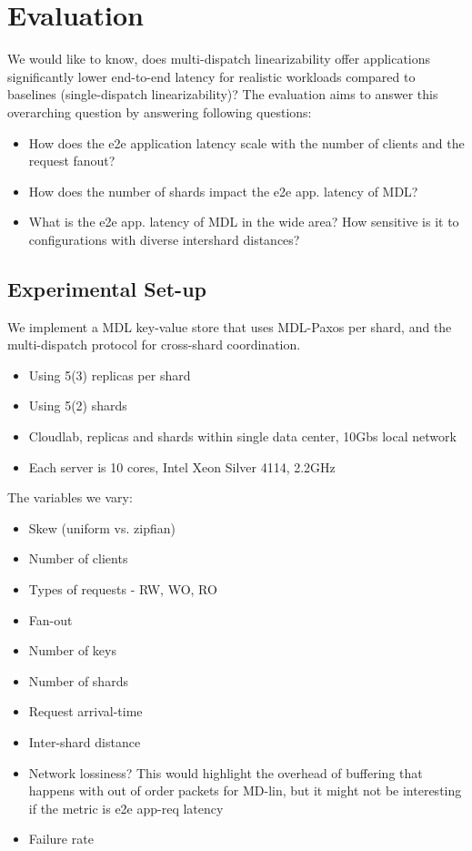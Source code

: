 \section{Evaluation}
\label{sec:eval}

We would like to know, does multi-dispatch linearizability offer applications significantly lower end-to-end latency for realistic workloads compared to baselines (single-dispatch linearizability)?
The evaluation aims to answer this overarching question by answering following questions:

\begin{itemize}
\item How does the e2e application latency scale with the number of clients and the request fanout?

\item How does the number of shards impact the e2e app. latency of MDL?

\item What is the e2e app. latency of MDL in the wide area? How sensitive is it to configurations with diverse intershard distances?
\end{itemize}

\subsection{Experimental Set-up}
We implement a MDL key-value store that uses MDL-Paxos per shard, and the multi-dispatch protocol for cross-shard coordination.
\begin{itemize}
    \item Using 5(3) replicas per shard
    \item Using 5(2) shards
    \item Cloudlab, replicas and shards within single data center, 10Gbs local network
    \item Each server is 10 cores, Intel Xeon Silver 4114, 2.2GHz
\end{itemize}
The variables we vary:
\begin{itemize}
    \item Skew (uniform vs. zipfian)
    \item Number of clients
    \item Types of requests - RW, WO, RO
    \item Fan-out
    \item Number of keys
    \item Number of shards
    \item Request arrival-time
    \item Inter-shard distance
    \item Network lossiness?
        \subitem This would highlight the overhead of buffering that happens with out of order packets for MD-lin, but it might not be interesting if the metric is e2e app-req latency
    \item Failure rate
\end{itemize}

